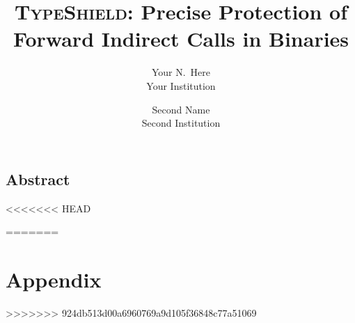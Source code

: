 \documentclass[letterpaper,twocolumn,10pt]{article}
\begin{document}
\date{}

\title{\Large \bf \textsc{TypeShield}: Precise Protection of Forward Indirect Calls in Binaries}

\author{
{\rm Your N.\ Here}\\
Your Institution
\and
{\rm Second Name}\\
Second Institution
} %

\maketitle

\thispagestyle{empty}


\subsection*{Abstract}

	







% 
% 


\listoftodos

{\footnotesize 
}


<<<<<<< HEAD

=======
\section*{Appendix}

>>>>>>> 924db513d00a6960769a9d105f36848c77a51069
\end{document}
